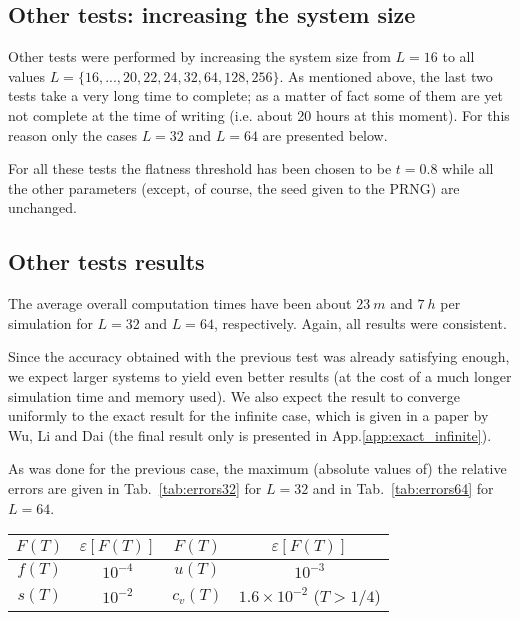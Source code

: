 \documentclass[11pt]{article}
\newcommand{\tabname}{Tab.~}
\newcommand{\appname}{App.}
\begin{document}
\subsection{Other tests: increasing the system size}

Other tests were performed by increasing the system size from $L=16$ to all values $L=\{16,...,20,22,24,32,64,128,256\}$. As mentioned above, the last two tests take a very long time to complete; as a matter of fact some of them are yet not complete at the time of writing (i.e. about 20 hours at this moment). For this reason only the cases $L=32$ and $L=64$ are presented below.

For all these tests the flatness threshold has been chosen to be $t=0.8$ while all the other parameters (except, of course, the seed given to the PRNG) are unchanged.


\subsection{Other tests results}

The average overall computation times have been about $23~m$ and $7~h$  per simulation for $L=32$ and $L=64$, respectively. Again, all results were consistent.

Since the accuracy obtained with the previous test was already satisfying enough, we expect larger systems to yield even better results (at the cost of a much longer simulation time and memory used). We also expect the result to converge uniformly to the exact result for the infinite case, which is given in a paper by Wu, Li and Dai\cite{bib:exact2} (the final result only is presented in \appname \ref{app:exact_infinite}).

As was done for the previous case, the maximum (absolute values of) the relative errors are given in \tabname \ref{tab:errors32} for $L=32$ and in \tabname \ref{tab:errors64} for $L=64$.

\begin{center}
\label{tab:errors32}
\begin{tabular}{cccc}
\toprule
$F(T)$	&	$\varepsilon[F(T)]$	&	$F(T)$		&	$\varepsilon[F(T)]$					\\
\midrule
$f(T)$	&	$10^{-4}$			&	$u(T)$		&	$10^{-3}$							\\
$s(T)$	&	$10^{-2}$			&	$c_v(T)$	&	$1.6 \times 10^{-2}$ ($T > 1/4$)	\\
\bottomrule
\end{tabular}
\end{center}
\end{document}
